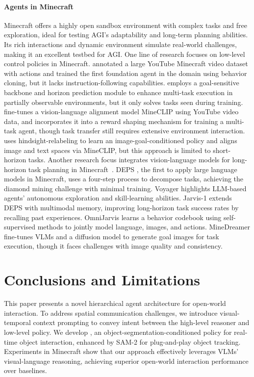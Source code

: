 \documentclass[11pt, a4paper, logo, two column]{craftjarvis}
\begin{document}
\paragraph{Agents in Minecraft} 
Minecraft offers a highly open sandbox environment with complex tasks and free exploration, ideal for testing AGI’s adaptability and long-term planning abilities. Its rich interactions and dynamic environment simulate real-world challenges, making it an excellent testbed for AGI. 
One line of research focuses on low-level control policies in Minecraft. \cite{vpt} annotated a large YouTube Minecraft video dataset with actions and trained the first foundation agent in the domain using behavior cloning, but it lacks instruction-following capabilities. 
\cite{worldmc} employs a goal-sensitive backbone and horizon prediction module to enhance multi-task execution in partially observable environments, but it only solves tasks seen during training. \cite{minedojo} fine-tunes a vision-language alignment model MineCLIP using YouTube video data, and incorporates it into a reward shaping mechanism for training a multi-task agent, though task transfer still requires extensive environment interaction. \cite{steve1} uses hindsight-relabeling to learn an image-goal-conditioned policy and aligns image and text spaces via MineCLIP, but this approach is limited to short-horizon tasks. 
Another research focus integrates vision-language models for long-horizon task planning in Minecraft~\citep{plan4mc,rat,mp5,steveeye,liu2024rlgpt}. DEPS \citep{deps}, the first to apply large language models in Minecraft, uses a four-step process to decompose tasks, achieving the diamond mining challenge with minimal training. Voyager \citep{voyager} highlights LLM-based agents’ autonomous exploration and skill-learning abilities. Jarvis-1 \citep{jarvis-1} extends DEPS with multimodal memory, improving long-horizon task success rates by recalling past experiences. OmniJarvis \citep{omnijarvis} learns a behavior codebook using self-supervised methods to jointly model language, images, and actions. 
MineDreamer \citep{minedreamer} fine-tunes VLMs and a diffusion model to generate goal images for task execution, though it faces challenges with image quality and consistency. 



\section{Conclusions and Limitations}
\label{sec:conclusion}
This paper presents a novel hierarchical agent architecture for open-world interaction. To address spatial communication challenges, we introduce visual-temporal context prompting to convey intent between the high-level reasoner and low-level policy. We develop \agent, an object-segmentation-conditioned policy for real-time object interaction, enhanced by SAM-2 for plug-and-play object tracking. Experiments in Minecraft show that our approach effectively leverages VLMs’ visual-language reasoning, achieving superior open-world interaction performance over baselines. 
\end{document}
